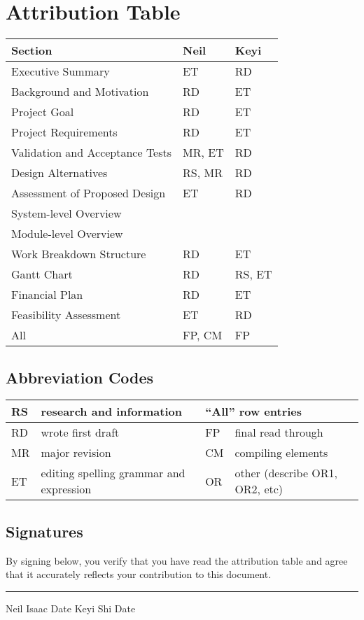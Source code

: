 \section{Attribution Table}

{\footnotesize
\begin{tabular}{|l|l|l|}
	\hline
	\textbf{Section} & \textbf{Neil} & \textbf{Keyi} \\
	\hline \hline
	Executive Summary & ET & RD \\
	\hline
	Background and Motivation & RD & ET \\
	Project Goal & RD & ET \\
	Project Requirements & RD & ET \\
	Validation and Acceptance Tests & MR, ET & RD \\
	\hline
	Design Alternatives & RS, MR & RD \\
	Assessment of Proposed Design & ET & RD \\
	System-level Overview & & \\
	Module-level Overview & & \\
	\hline
	Work Breakdown Structure & RD & ET \\
	Gantt Chart & RD & RS, ET \\
	Financial Plan & RD & ET \\
	Feasibility Assessment & ET & RD \\
	\hline
	All & FP, CM & FP \\
	\hline
\end{tabular}
}

\subsection*{Abbreviation Codes}

{\footnotesize
\begin{tabular}[width=7in]{|l|l||l|l|}
	\hline
	RS & research and information & \multicolumn{2}{l|}{``All'' row entries} \\ \hline
	RD & wrote first draft & FP & final read through \\ \hline
	MR & major revision & CM & compiling elements \\ \hline
	ET & editing spelling grammar and expression & OR & other (describe OR1, OR2, etc) \\ \hline
\end{tabular}
}

\subsection*{Signatures}

By signing below, you verify that you have read the attribution table and agree that it accurately reflects your contribution to this document.

\vfill

\hrule
Neil Isaac \hspace{1in} Date \hspace{1in} Keyi Shi \hspace{1in} Date

